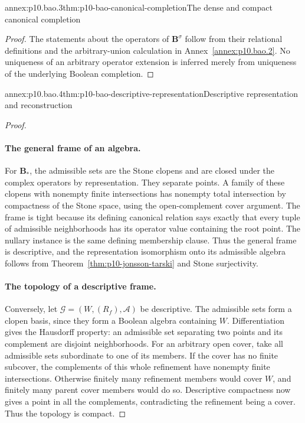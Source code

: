 \begin{annexitem}{annex:p10.bao.3}{thm:p10-bao-canonical-completion}{The dense and compact canonical completion}
\begin{proof}
The statements about the operators of \(\mathbf B^\sigma\) follow
from their relational definitions and the arbitrary-union
calculation in Annex~\ref{annex:p10.bao.2}.
No uniqueness of an arbitrary operator extension is inferred merely
from uniqueness of the underlying Boolean completion.
\end{proof}
\end{annexitem}

\begin{annexitem}{annex:p10.bao.4}{thm:p10-bao-descriptive-representation}{Descriptive representation and reconstruction}
\begin{proof}
\paragraph{The general frame of an algebra.}
For \(\mathbf B_*\), the admissible sets are the Stone clopens
and are closed under the complex operators by representation.
They separate points.
A family of these clopens with nonempty finite intersections
has nonempty total intersection by compactness of the Stone
space, using the open-complement cover argument.
The frame is tight because its defining canonical relation says
exactly that every tuple of admissible neighborhoods has its
operator value containing the root point.
The nullary instance is the same defining membership clause.
Thus the general frame is descriptive, and the representation
isomorphism onto its admissible algebra follows from
Theorem~\ref{thm:p10-jonsson-tarski} and Stone surjectivity.

\paragraph{The topology of a descriptive frame.}
Conversely, let \(\mathcal G=(W,(R_f),\mathcal A)\) be descriptive.
The admissible sets form a clopen basis, since they form a Boolean
algebra containing \(W\).
Differentiation gives the Hausdorff property: an admissible set
separating two points and its complement are disjoint neighborhoods.
For an arbitrary open cover, take all admissible sets subordinate
to one of its members.
If the cover has no finite subcover, the complements of this
whole refinement have nonempty finite intersections.
Otherwise finitely many refinement members would cover \(W\),
and finitely many parent cover members would do so.
Descriptive compactness now gives a point in all the complements,
contradicting the refinement being a cover.
Thus the topology is compact.


\end{proof}
\end{annexitem}
